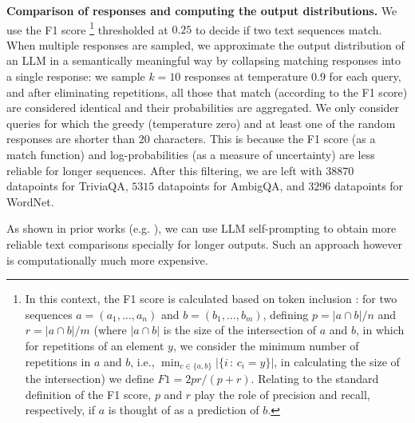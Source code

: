 \documentclass[a4paper]{article}
\theoremstyle{plain}
\theoremstyle{definition}
\theoremstyle{plain}
\begin{document}
\textbf{Comparison of responses and computing the output distributions.} We use the F1 score%
\footnote{
In this context, the F1 score is calculated based on token inclusion \citep{joshi2017triviaqa, devlin2019bert}: for two sequences $a=(a_1,\ldots,a_n)$ and $b=(b_1,\ldots,b_m)$, defining $p=|a \cap b|/n$ and $r=|a \cap b|/m$ (where $|a \cap b|$ is the size of the intersection of $a$ and $b$, in which for repetitions of an element $y$, we consider the minimum number of repetitions in $a$ and $b$, i.e., $\min_{c\in \{a,b\}} |\{i\,:\, c_i=y\}|$, in calculating the size of the intersection) 
we define $F1 = 2pr/(p+r)$. 
Relating to the standard definition of the F1 score, $p$ and $r$ play the role of precision and recall, respectively, if $a$ is thought of as a prediction of $b$.} thresholded at $0.25$ to decide if two text sequences match. When multiple responses are sampled, we approximate the output distribution of an LLM in a semantically meaningful way by collapsing matching responses into a single response: we sample $k=10$ responses at temperature $0.9$ for each query, and after eliminating repetitions, all those that match (according to the F1 score) are considered identical and their probabilities are aggregated. 
We only consider queries for which the greedy (temperature zero) and at least one of the random responses are shorter than $20$ characters.
This is because the F1 score (as a match function) and log-probabilities (as a measure of uncertainty) are less reliable for longer sequences. After this filtering, we are left with $38870$ datapoints for TriviaQA, $5315$ datapoints for AmbigQA, and $3296$ datapoints for WordNet. 

As shown in prior works (e.g. \citet{KuhnARXIV2023, conformal-abstention-2024}), we can use LLM self-prompting to obtain more reliable text comparisons specially for longer outputs. Such an approach however is computationally much more expensive.   
\end{document}
